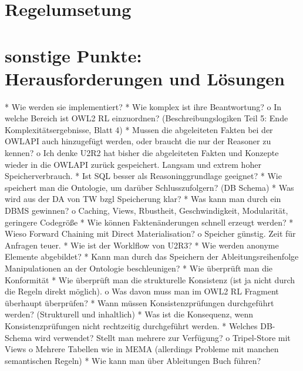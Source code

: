\section{Regelumsetung}


\section{sonstige Punkte: Herausforderungen und Lösungen}


    
        * Wie werden sie implementiert?
    * Wie komplex ist ihre Beantwortung?
          o In welche Bereich ist OWL2 RL einzuordnen? (Beschreibungslogiken Teil 5: Ende Komplexitätsergebnisse, Blatt 4) 
    * Mussen die abgeleiteten Fakten bei der OWLAPI auch hinzugefügt werden, oder braucht die nur der Reasoner zu kennen?
          o Ich denke U2R2 hat bisher die abgeleiteten Fakten und Konzepte wieder in die OWLAPI zurück gespeichert. Langsam und extrem hoher Speicherverbrauch. 
    * Ist SQL besser als Reasoninggrundlage geeignet?
    * Wie speichert man die Ontologie, um darüber Schlusszufolgern? (DB Schema)
    * Was wird aus der DA von TW bzgl Speicherung klar?
    * Was kann man durch ein DBMS gewinnen?
          o Caching, Views, Rbustheit, Geschwindigkeit, Modularität, geringere Codegröße 
    * Wie können Faktenänderungen schnell erzeugt werden?
    * Wieso Forward Chaining mit Direct Materialisation?
          o Speicher günstig. Zeit für Anfragen teuer. 
    * Wie ist der Worklflow von U2R3?
    * Wie werden anonyme Elemente abgebildet?
    * Kann man durch das Speichern der Ableitungsreihenfolge Manipulationen an der Ontologie beschleunigen?
    * Wie überprüft man die Konformität
    * Wie überprüft man die strukturelle Konsistenz (ist ja nicht durch die Regeln direkt möglich).
          o Was davon muss man im OWL2 RL Fragment überhaupt überprüfen? 
    * Wann müssen Konsistenzprüfungen durchgeführt werden? (Strukturell und inhaltlich)
    * Was ist die Konsequenz, wenn Konsistenzprüfungen nicht rechtzeitig durchgeführt werden.
    * Welches DB-Schema wird verwendet? Stellt man mehrere zur Verfügung?
          o Tripel-Store mit Views
          o Mehrere Tabellen wie in MEMA (allerdings Probleme mit manchen semantischen Regeln) 
    * Wie kann man über Ableitungen Buch führen? 
